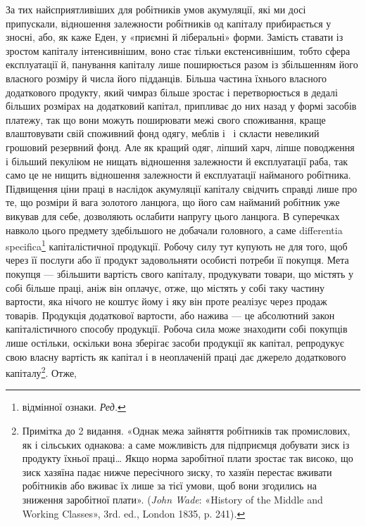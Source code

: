 За тих найсприятливіших для робітників умов акумуляції,
які ми досі припускали, відношення залежности робітників од
капіталу прибирається у зносні, або, як каже Еден, у «приємні
й ліберальні» форми. Замість ставати із зростом капіталу інтенсивнішим,
воно стає тільки екстенсивнішим, тобто сфера експлуатації
й, панування капіталу лише поширюється разом із збільшенням
його власного розміру й числа його підданців. Більша
частина їхнього власного додаткового продукту, який чимраз
більше зростає і перетворюється в дедалі більших розмірах на
додатковий капітал, припливає до них назад у формі засобів
платежу, так що вони можуть поширювати межі свого споживання,
краще влаштовувати свій споживний фонд одягу, меблів
і~ і скласти невеликий грошовий резервний фонд. Але як
кращий одяг, ліпший харч, ліпше поводження і більший пекуліюм
не нищать відношення залежности й експлуатації раба,
так само це не нищить відношення залежности й експлуатації
найманого робітника. Підвищення ціни праці в наслідок акумуляції
капіталу свідчить справді лише про те, що розміри й вага
золотого ланцюга, що його сам найманий робітник уже викував
для себе, дозволяють ослабити напругу цього ланцюга. В суперечках
навколо цього предмету здебільшого не добачали головного,
а саме differentia specifica\footnote*{
відмінної ознаки. \emph{Ред.}
} капіталістичної продукції.
Робочу силу тут купують не для того, щоб через її послуги або
її продукт задовольняти особисті потреби її покупця. Мета покупця
— збільшити вартість свого капіталу, продукувати товари,
що містять у собі більше праці, аніж він оплачує, отже,
що містять у собі таку частину вартости, яка нічого не коштує
йому і яку він проте реалізує через продаж товарів. Продукція
додаткової вартости, або нажива — це абсолютний закон капіталістичного
способу продукції. Робоча сила може знаходити
собі покупців лише остільки, оскільки вона зберігає засоби продукції
як капітал, репродукує свою власну вартість як капітал
і в неоплаченій праці дає джерело додаткового капіталу\footnote{
Примітка до 2 видання. «Однак межа зайняття робітників так
промислових, як і сільських однакова: а саме можливість для підприємця
добувати зиск із продукту їхньої праці\dots{} Якщо норма заробітної
плати зростає так високо, що зиск хазяїна падає нижче пересічного
зиску, то хазяїн перестає вживати робітників або вживає їх лише за
тієї умови, щоб вони згодились на зниження заробітної плати». (\emph{John
Wade}: «History of the Middle and Working Classes», 3rd. ed., London
1835, p. 241).
}. Отже,
